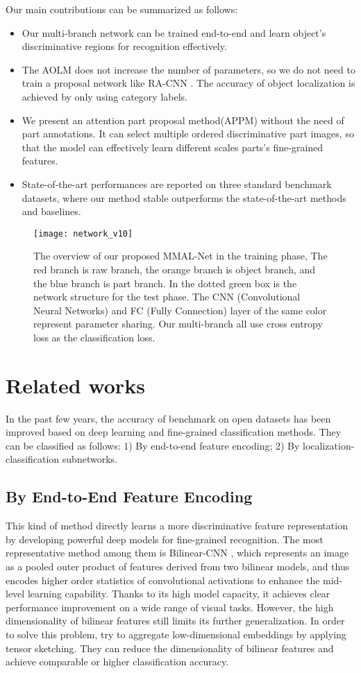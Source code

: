 \documentclass[runningheads]{llncs}
\begin{document}
\indent Our main contributions can be summarized as follows: 
\begin{itemize}
\item[]Our multi-branch network can be trained end-to-end and learn object's discriminative regions for recognition effectively.
\item[]The AOLM does not increase the number of parameters, so we do not need to train a proposal network like RA-CNN \cite{fu2017look}. The accuracy of object localization is achieved by only using category labels.
\item[]We present an attention part proposal method(APPM) without the need of part annotations. It can select multiple ordered discriminative part images, so that the model can effectively learn different scales parts's fine-grained features.
\item[]State-of-the-art performances are reported on three standard benchmark datasets, where our method stable outperforms the state-of-the-art methods and baselines.
\end{itemize}
\begin{figure}[h]
\texttt{[image: network\_v10]}
\caption{The overview of our proposed MMAL-Net in the training phase, The red branch is raw branch, the orange branch is object branch, and the blue branch is part branch. In the dotted green box is the network structure for the test phase. The CNN (Convolutional Neural Networks) and FC (Fully Connection) layer of the same color represent parameter sharing. Our multi-branch all use cross entropy loss as the classification loss.} \label{fg1}
\end{figure}
\section{Related works}
In the past few years, the accuracy of benchmark on open datasets has been improved based on deep learning and fine-grained classification methods. They can be classified as follows: 1) By end-to-end feature encoding; 2) By localization-classification subnetworks. 
\subsection{By End-to-End Feature Encoding}
This kind of method directly learns a more discriminative feature representation by developing powerful deep models for fine-grained recognition. The most representative method among them is Bilinear-CNN \cite{lin2015bilinear}, which represents an image as a pooled outer product of features derived from two bilinear models, and thus encodes higher order statistics of convolutional activations to enhance the mid-level learning capability. Thanks to its high model capacity, it achieves clear performance improvement on a wide range of visual tasks. However, the high dimensionality of bilinear features still limits its further generalization. In order to solve this problem, \cite{gao2016compact,cui2017kernel} try to aggregate low-dimensional embeddings by applying tensor sketching. They can reduce the dimensionality of bilinear features and achieve comparable or higher classification accuracy.
\end{document}

